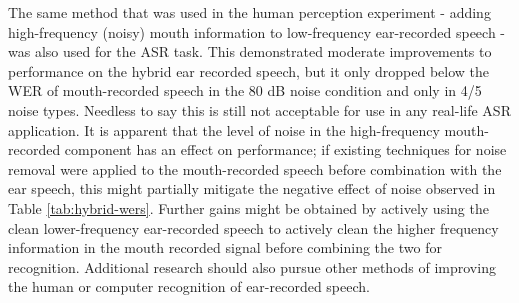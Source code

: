 The same method that was used in the human perception experiment - adding high-frequency (noisy) mouth information to low-frequency ear-recorded speech - was also used for the ASR task.  This demonstrated moderate improvements to performance on the hybrid ear recorded speech, but it only dropped below the WER of mouth-recorded speech in the 80 dB noise condition and only in 4/5 noise types.  Needless to say this is still not acceptable for use in any real-life ASR application.  It is apparent that the level of noise in the high-frequency mouth-recorded component has an effect on performance; if existing techniques for noise removal were applied to the mouth-recorded speech before combination with the ear speech, this might partially mitigate the negative effect of noise observed in Table \ref{tab:hybrid-wers}.  Further gains might be obtained by actively using the clean lower-frequency ear-recorded speech to actively clean the higher frequency information in the mouth recorded signal before combining the two for recognition.   
Additional research should also pursue other methods of improving the human or computer recognition of ear-recorded speech. 


